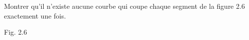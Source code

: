 Montrer qu'il n'existe aucune courbe qui coupe chaque segment de la figure 2.6 exactement une fois.
\begin{center}

Fig. 2.6
\end{center}
